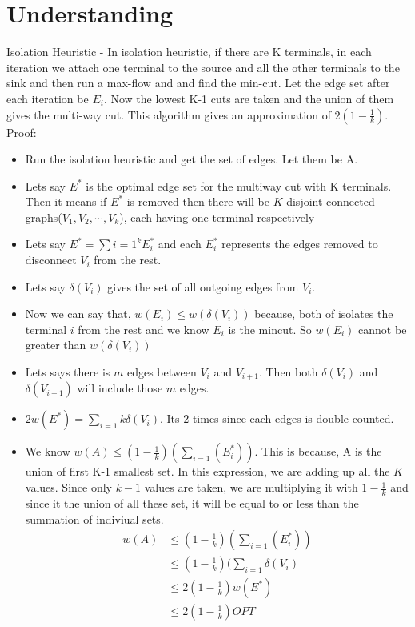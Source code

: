\documentclass[11pt]{article}
\begin{document}
\section{Understanding}
Isolation Heuristic - 
In isolation heuristic, if there are K terminals, in each iteration we attach one terminal to the source and all the other terminals to the sink and then run a max-flow and and find the min-cut. Let the edge set after each iteration be $E_i$. Now the lowest K-1 cuts are taken and the union of them gives the multi-way cut. This algorithm gives an approximation of $2(1-\frac{1}{k})$.
Proof:
\begin{itemize}
    \item Run the isolation heuristic and get the set of edges. Let them be A.
    \item Lets say $E^*$ is the optimal edge set for the multiway cut with K terminals. Then it means if $E^*$ is removed then there will be $K$ disjoint connected graphs($V_1, V_2,\cdots,V_k$), each having one terminal respectively
    \item Lets say $E^* = \sum{i=1}^{k}{E_i^*}$ and each $E_i^*$ represents the edges removed to disconnect $V_i$ from the rest.
    \item Lets say $\delta(V_i)$ gives the set of all outgoing edges from $V_i$.
    \item Now we can say that, $w(E_i) \le w(\delta(V_i))$ because, both of isolates the terminal $i$ from the rest and we know $E_i$ is the mincut. So $w(E_i)$ cannot be greater than $w(\delta(V_i))$
    \item Lets says there is $m$ edges between $V_i$ and $V_{i+1}$. Then both $\delta(V_i)$ and $\delta(V_{i+1})$ will include those $m$ edges.
    \item $2w(E^*) = \sum_{i=1}{k}{\delta(V_i)} $. Its 2 times since each edges is double counted. 
    \item We know $w(A) \le (1 -\frac{1}{k})(\sum_{i=1}(E_i^*))$. This is because, A is the union of first K-1 smallest set. In this expression, we are adding up all the $K$ values. Since only $k-1$ values are taken, we are multiplying it with $1 - \frac{1}{k}$ and since it the union of all these set, it will be equal to or less than the summation of indiviual sets.
        \begin{align*}
            w(A) &\le (1 -\frac{1}{k})(\sum_{i=1}(E_i^*)) \\
            &\le (1 -\frac{1}{k})(\sum_{i=1}{\delta(V_i)}\\
            &\le 2(1 -\frac{1}{k})w(E^*)\\
            &\le 2(1 -\frac{1}{k}) OPT
        \end{align*}

\end{itemize}
\end{document}

